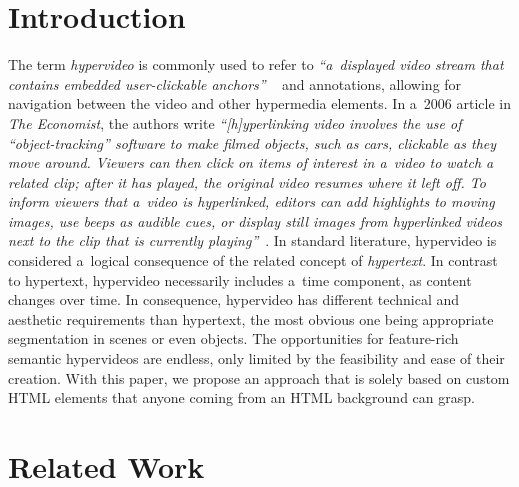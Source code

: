 \documentclass[runningheads,a4paper]{llncs}
\begin{document}
\section{Introduction}


The term \emph{hypervideo} is commonly used to refer to
\textit{``a~displayed video stream that contains embedded user-clickable anchors''}%
~\cite{sawhney1996hypercafe,smith2002extensible}
and annotations, allowing for navigation between the video and other hypermedia elements.
In a~2006 article in \emph{The Economist}, the authors write 
\textit{``[h]yperlinking video involves the use of ``object-tracking'' software
to make filmed objects, such as cars, clickable as they move around.
Viewers can then click on items of interest in a~video
to watch a related clip; after it has played,
the original video resumes where it left off.
To inform viewers that a~video is hyperlinked,
editors can add highlights to moving images, use beeps as audible cues,
or display still images from hyperlinked videos
next to the clip that is currently playing''}~\cite{economist2006hypervideo}.
In standard literature, hypervideo is considered a~logical consequence
of the related concept of \emph{hypertext}.
In contrast to hypertext, hypervideo necessarily includes a~time component,
as content changes over time.
In consequence, hypervideo has different technical and aesthetic requirements
than hypertext, the most obvious one being appropriate segmentation in scenes
or even objects.
The opportunities for feature-rich semantic hypervideos are endless,
only limited by the feasibility and ease of their creation.
With this paper, we propose an approach that is solely based on 
custom HTML elements that anyone coming from an HTML background can grasp.

\section{Related Work}
\end{document}
